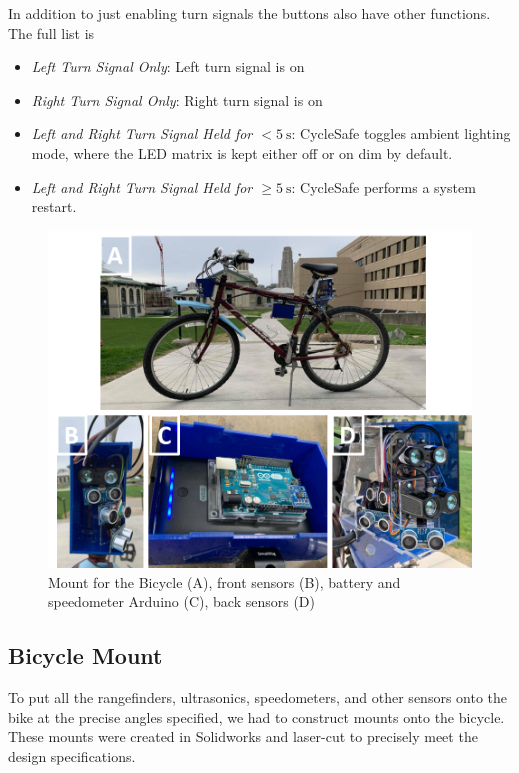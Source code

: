 \documentclass[journal]{IEEEtran}
\begin{document}
In addition to just enabling turn signals the buttons also have other functions. The full list is
\begin{itemize}
    \item \textit{Left Turn Signal Only}: Left turn signal is on
    \item \textit{Right Turn Signal Only}: Right turn signal is on
    \item \textit{Left and Right Turn Signal Held for $<\SI{5}{\s}$}: CycleSafe toggles ambient lighting mode, where the LED matrix is kept either off or on dim by default.
    \item \textit{Left and Right Turn Signal Held for $\geq\SI{5}{\s}$}: CycleSafe performs a system restart.
\end{itemize}

\begin{figure}
    \centering
    \includegraphics[width=\columnwidth]{images/bike_mount.png}
    \caption{Mount for the Bicycle (A), front sensors (B), battery and speedometer Arduino (C), back sensors (D)}
    \label{fig:bike_mount}
\end{figure}

\subsection{Bicycle Mount}
To put all the rangefinders, ultrasonics, speedometers, and other sensors onto the bike at the precise angles specified, we had to construct mounts onto the bicycle. These mounts were created in Solidworks and laser-cut to precisely meet the design specifications.
\end{document}
